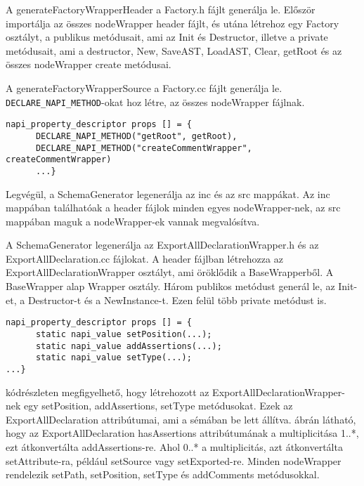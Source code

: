 A generateFactoryWrapperHeader a Factory.h fájlt generálja le.
Először importálja az összes nodeWrapper header fájlt, és utána létrehoz egy Factory osztályt, a publikus metódusait, ami az Init és Destructor, illetve a private metódusait,
ami a destructor, New, SaveAST, LoadAST, Clear, getRoot és az összes nodeWrapper create metódusai.

\noindent

A generateFactoryWrapperSource a Factory.cc fájlt generálja le.
\texttt{DECLARE\_NAPI\_METHOD}-okat hoz létre, az összes nodeWrapper fájlnak.

\begin{lstlisting}[caption={Factory.cc fájl}, label={lst:factory_cc}, language={CStyle}]
napi_property_descriptor props [] = {
      DECLARE_NAPI_METHOD("getRoot", getRoot),
      DECLARE_NAPI_METHOD("createCommentWrapper", createCommentWrapper)
      ...}
\end{lstlisting}

\noindent

Legvégül, a SchemaGenerator legenerálja az inc és az src mappákat.
Az inc mappában találhatóak a header fájlok minden egyes nodeWrapper-nek, az src mappában maguk a nodeWrapper-ek vannak megvalósítva.

\noindent

A SchemaGenerator legenerálja az ExportAllDeclarationWrapper.h és az ExportAllDeclaration.cc fájlokat.
A header fájlban létrehozza az ExportAllDeclarationWrapper osztályt, ami öröklődik a BaseWrapperből. A BaseWrapper alap Wrapper osztály.
Három publikos metódust generál le, az Init-et, a Destructor-t és a NewInstance-t.
Ezen felül több private metódust is.

\begin{lstlisting}[caption={ExportAllDeclarationWrapper.h fájl}, label={lst:ExportAllDeclarationWrapper_header}, language={CStyle}]
napi_property_descriptor props [] = {
      static napi_value setPosition(...);
      static napi_value addAssertions(...);
      static napi_value setType(...);
...}
\end{lstlisting}

 kódrészleten megfigyelhető, hogy létrehozott az ExportAllDeclarationWrapper-nek egy setPosition, addAssertions, setType metódusokat.
Ezek az ExportAllDeclaration attribútumai, ami a sémában be lett állítva.
 ábrán látható, hogy az ExportAllDeclaration hasAssertions attribútumának a multiplicitása 1..*, ezt átkonvertálta addAssertions-re.
Ahol 0..* a multiplicitás, azt átkonvertálta setAttribute-ra, például setSource vagy setExported-re.
Minden nodeWrapper rendelezik setPath, setPosition, setType és addComments metódusokkal.

